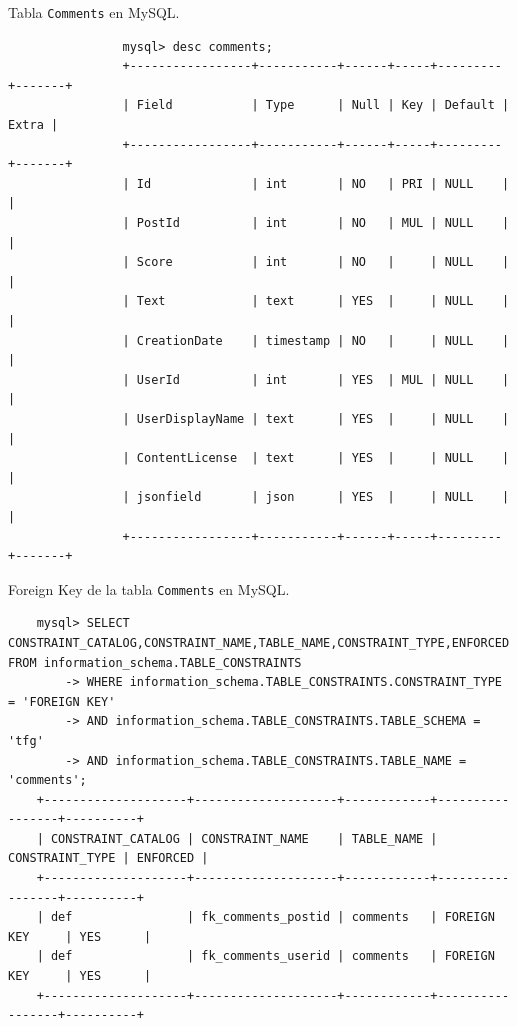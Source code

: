 \documentclass[a4paper, 12pt]{book}
\begin{document}
\begin{listing}[t]
    \caption{Tabla \texttt{Comments} en MySQL.}{}
    \label{lst:4}
    \begin{verbatim}
                mysql> desc comments;
                +-----------------+-----------+------+-----+---------+-------+
                | Field           | Type      | Null | Key | Default | Extra |
                +-----------------+-----------+------+-----+---------+-------+
                | Id              | int       | NO   | PRI | NULL    |       |
                | PostId          | int       | NO   | MUL | NULL    |       |
                | Score           | int       | NO   |     | NULL    |       |
                | Text            | text      | YES  |     | NULL    |       |
                | CreationDate    | timestamp | NO   |     | NULL    |       |
                | UserId          | int       | YES  | MUL | NULL    |       |
                | UserDisplayName | text      | YES  |     | NULL    |       |
                | ContentLicense  | text      | YES  |     | NULL    |       |
                | jsonfield       | json      | YES  |     | NULL    |       |
                +-----------------+-----------+------+-----+---------+-------+
    \end{verbatim}
\end{listing}
\begin{listing}[t]
    \caption{Foreign Key de la tabla \texttt{Comments} en MySQL.}{}
    \label{lst:5}
    \begin{verbatim}
    mysql> SELECT CONSTRAINT_CATALOG,CONSTRAINT_NAME,TABLE_NAME,CONSTRAINT_TYPE,ENFORCED FROM information_schema.TABLE_CONSTRAINTS
        -> WHERE information_schema.TABLE_CONSTRAINTS.CONSTRAINT_TYPE = 'FOREIGN KEY'
        -> AND information_schema.TABLE_CONSTRAINTS.TABLE_SCHEMA = 'tfg'
        -> AND information_schema.TABLE_CONSTRAINTS.TABLE_NAME = 'comments';
    +--------------------+--------------------+------------+-----------------+----------+
    | CONSTRAINT_CATALOG | CONSTRAINT_NAME    | TABLE_NAME | CONSTRAINT_TYPE | ENFORCED |
    +--------------------+--------------------+------------+-----------------+----------+
    | def                | fk_comments_postid | comments   | FOREIGN KEY     | YES      |
    | def                | fk_comments_userid | comments   | FOREIGN KEY     | YES      |
    +--------------------+--------------------+------------+-----------------+----------+
    \end{verbatim}
\end{listing}
\end{document}
